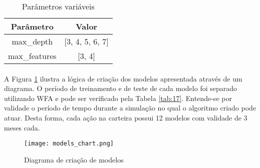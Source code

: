 \begin{table}[!htb]
    \begin{center}
        \begin{tabular}{ c|c }
            Parâmetro & Valor \\
            \hline
            max\_depth & [3, 4, 5, 6, 7] \\
            max\_features & [3, 4] \\
        \end{tabular}
        \caption{Parâmetros variáveis}
        \label{tab:16}
    \end{center}
\end{table}

\paragraph{} A Figura \ref{fig:580} ilustra a lógica de criação dos modelos apresentada através de um diagrama. O período de treinamento e de teste de cada modelo foi separado utilizando WFA e pode ser verificado pela Tabela \ref{tab:17}. Entende-se por validade o período de tempo durante a simulação no qual o algoritmo criado pode atuar. Desta forma, cada ação na carteira possui 12 modelos com validade de 3 meses cada.

\begin{figure}[!htb]
    \texttt{[image: models\_chart.png]}
    \centering
    \caption{Diagrama de criação de modelos}
    \label{fig:580}
\end{figure}

